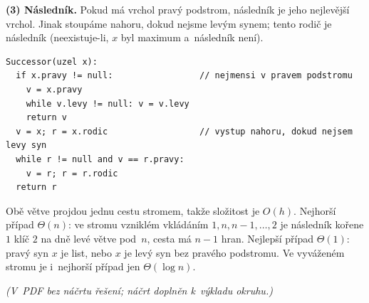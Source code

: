 \textbf{(3) Následník.} Pokud má vrchol pravý podstrom, následník je jeho nejlevější
vrchol. Jinak stoupáme nahoru, dokud nejsme levým synem; tento rodič je následník
(neexistuje-li, $x$ byl maximum a~následník není).
\begin{lstlisting}
Successor(uzel x):
  if x.pravy != null:                 // nejmensi v pravem podstromu
    v = x.pravy
    while v.levy != null: v = v.levy
    return v
  v = x; r = x.rodic                  // vystup nahoru, dokud nejsem levy syn
  while r != null and v == r.pravy:
    v = r; r = r.rodic
  return r
\end{lstlisting}
Obě větve projdou jednu cestu stromem, takže složitost je $O(h)$. Nejhorší případ
$\Theta(n)$: ve stromu vzniklém vkládáním $1,n,n-1,\dots,2$ je následník kořene $1$
klíč $2$ na dně levé větve pod~$n$, cesta má $n-1$ hran. Nejlepší případ $\Theta(1)$:
pravý syn $x$ je list, nebo $x$ je levý syn bez pravého podstromu. Ve vyváženém stromu
je i~nejhorší případ jen $\Theta(\log n)$.

\medskip
\textit{(V~PDF bez náčrtu řešení; náčrt doplněn k~výkladu okruhu.)}

